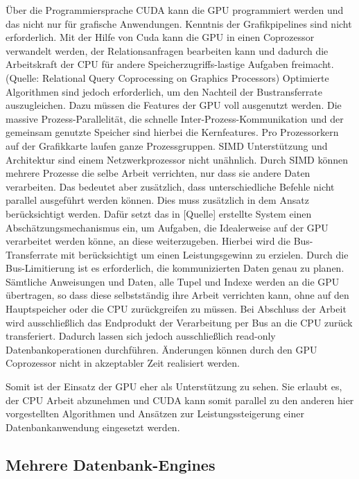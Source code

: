 Über die Programmiersprache CUDA kann die GPU programmiert werden und das nicht nur für grafische Anwendungen. Kenntnis der Grafikpipelines sind nicht erforderlich. Mit der Hilfe von Cuda kann die GPU in einen Coprozessor verwandelt werden, der Relationsanfragen bearbeiten kann und dadurch die Arbeitskraft der CPU für andere Speicherzugriffs-lastige Aufgaben freimacht. (Quelle: Relational Query Coprocessing on Graphics Processors) Optimierte Algorithmen sind jedoch erforderlich, um den Nachteil der Bustransferrate auszugleichen. Dazu müssen die Features der GPU voll ausgenutzt werden. Die massive Prozess-Parallelität, die schnelle Inter-Prozess-Kommunikation und der gemeinsam genutzte Speicher sind hierbei die Kernfeatures. Pro Prozessorkern auf der Grafikkarte laufen ganze Prozessgruppen. SIMD Unterstützung und Architektur sind einem Netzwerkprozessor nicht unähnlich. Durch SIMD können mehrere Prozesse die selbe Arbeit verrichten, nur dass sie andere Daten verarbeiten. Das bedeutet aber zusätzlich, dass unterschiedliche Befehle nicht parallel ausgeführt werden können. Dies muss zusätzlich in dem Ansatz berücksichtigt werden. Dafür setzt das in [Quelle] erstellte System einen Abschätzungsmechanismus ein, um Aufgaben, die Idealerweise auf der GPU verarbeitet werden könne, an diese weiterzugeben. Hierbei wird die Bus-Transferrate mit berücksichtigt um einen Leistungsgewinn zu erzielen. Durch die Bus-Limitierung ist es erforderlich, die kommunizierten Daten genau zu planen. Sämtliche Anweisungen und Daten, alle Tupel und Indexe werden an die GPU übertragen, so dass diese selbstständig ihre Arbeit verrichten kann, ohne auf den Hauptspeicher oder die CPU zurückgreifen zu müssen. Bei Abschluss der Arbeit wird ausschließlich das Endprodukt der Verarbeitung per Bus an die CPU zurück transferiert. Dadurch lassen sich jedoch ausschließlich read-only Datenbankoperationen durchführen. Änderungen können durch den GPU Coprozessor nicht in akzeptabler Zeit realisiert werden.

Somit ist der Einsatz der GPU eher als Unterstützung zu sehen. Sie erlaubt es, der CPU Arbeit abzunehmen und CUDA kann somit parallel zu den anderen hier vorgestellten Algorithmen und Ansätzen zur Leistungssteigerung einer Datenbankanwendung eingesetzt werden.


\subsection{Mehrere Datenbank-Engines}
\label{sec:DBEngines}

